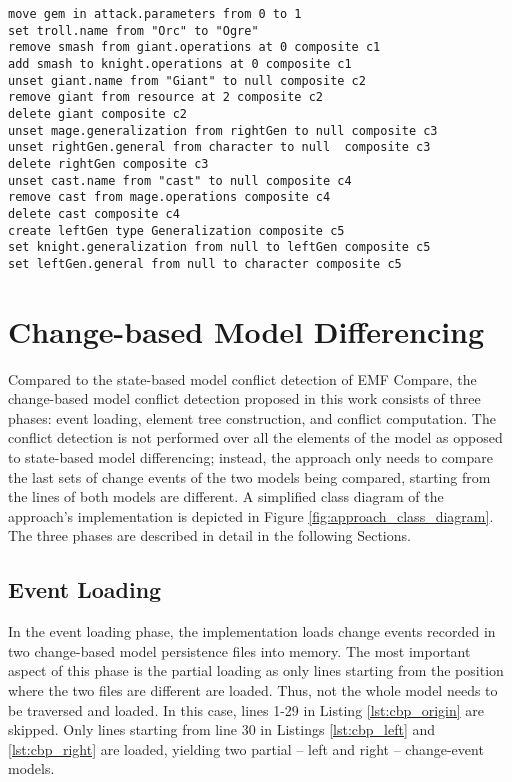 \vspace{-20pt}
\begin{lstlisting}[firstnumber=1,style=eol,caption={The identified diffs presented as change events.},label=lst:readable_diffs]
move gem in attack.parameters from 0 to 1
set troll.name from "Orc" to "Ogre"
remove smash from giant.operations at 0 composite c1
add smash to knight.operations at 0 composite c1
unset giant.name from "Giant" to null composite c2
remove giant from resource at 2 composite c2
delete giant composite c2
unset mage.generalization from rightGen to null composite c3
unset rightGen.general from character to null  composite c3
delete rightGen composite c3
unset cast.name from "cast" to null composite c4
remove cast from mage.operations composite c4
delete cast composite c4
create leftGen type Generalization composite c5
set knight.generalization from null to leftGen composite c5
set leftGen.general from null to character composite c5
\end{lstlisting}

\section{Change-based Model Differencing}
\label{sec:change_based_approach_for_comparing_models}
Compared to the state-based model conflict detection of EMF Compare, the change-based model conflict detection proposed in this work consists of three phases: event loading, element tree construction, and conflict computation.
The conflict detection is not performed over all the elements of the model as opposed to state-based model differencing; instead, the approach only needs to compare the last sets of change events of the two models being compared, starting from the lines of both models are different. A simplified class diagram of the approach's implementation \cite{epsilonlabs2019emfcbp} is depicted in Figure \ref{fig:approach_class_diagram}. The three phases are described in detail in the following Sections.

\subsection{Event Loading}
\label{sec:event_loading}
In the event loading phase, the implementation loads change events recorded in two change-based model persistence files into memory.
The most important aspect of this phase is the partial loading as only lines starting from the position where the two files are different are loaded.
Thus, not the whole model needs to be traversed and loaded.
In this case, lines 1-29 in Listing \ref{lst:cbp_origin} are skipped. Only lines starting from line 30 in Listings \ref{lst:cbp_left} and \ref{lst:cbp_right} are loaded, yielding two partial -- left and right -- change-event models. 

